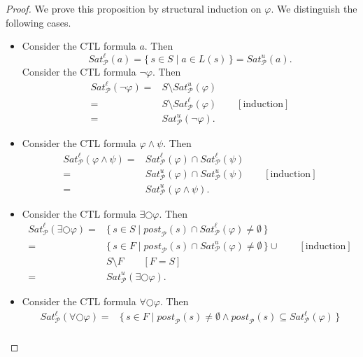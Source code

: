 \documentclass[12pt]{article}
\newcommand{\nxt}{\bigcirc}
\theoremstyle{definition}
\newcommand{\comment}[1]{\hspace{2em}[\mbox{#1}]}
\begin{document}
\begin{proof}
We prove this proposition by structural induction on $\varphi$.  We distinguish the following cases.
\begin{itemize}
\item 
Consider the CTL formula $a$.  Then
\[
\mathit{Sat}^{\ell}_{\mathcal{P}}(a)
= \{\, s \in S \mid a \in L(s) \,\}
= \mathit{Sat}^u_{\mathcal{P}}(a).
\]
Consider the CTL formula $\neg \varphi$.  Then
\begin{align*}
\mathit{Sat}^{\ell}_{\mathcal{P}}(\neg \varphi)
= & S \setminus \mathit{Sat}^{u}_{\mathcal{P}}(\varphi)\\
= & S \setminus \mathit{Sat}^{\ell}_{\mathcal{P}}(\varphi)
\comment{induction}\\
= & \mathit{Sat}^u_{\mathcal{P}}(\neg \varphi).
\end{align*}
\item
Consider the CTL formula $\varphi \wedge \psi$.  Then
\begin{align*}
\mathit{Sat}^{\ell}_{\mathcal{P}}(\varphi \wedge \psi)
= & \mathit{Sat}^{\ell}_{\mathcal{P}}(\varphi) \cap \mathit{Sat}^{\ell}_{\mathcal{P}}(\psi)\\
= & \mathit{Sat}^u_{\mathcal{P}}(\varphi) \cap \mathit{Sat}^u_{\mathcal{P}}(\psi)
\comment{induction}\\
= & \mathit{Sat}^u_{\mathcal{P}}(\varphi \wedge \psi).
\end{align*}
\item
Consider the CTL formula $\exists \nxt \varphi$.  Then
\begin{align*}
\mathit{Sat}^{\ell}_{\mathcal{P}}(\exists \nxt \varphi)
= & \{\, s \in S \mid \mathit{post}_{\mathcal{P}}(s) \cap \mathit{Sat}^{\ell}_{\mathcal{P}}(\varphi) \not= \emptyset \,\}\\
= & \{\, s \in F \mid \mathit{post}_{\mathcal{P}}(s) \cap \mathit{Sat}^u_{\mathcal{P}}(\varphi) \not= \emptyset \,\} \cup
\comment{induction}\\
& S \setminus F
\comment{$F = S$}\\
= & \mathit{Sat}^u_{\mathcal{P}}(\exists \nxt \varphi).
\end{align*}
\item
Consider the CTL formula $\forall \nxt \varphi$.  Then
\begin{align*}
\mathit{Sat}^{\ell}_{\mathcal{P}}(\forall \nxt \varphi)
= & \{\, s \in F \mid \mathit{post}_{\mathcal{P}}(s) \not= \emptyset \wedge \mathit{post}_{\mathcal{P}}(s) \subseteq \mathit{Sat}^{\ell}_{\mathcal{P}}(\varphi) \,\}\\

\end{align*}
\end{itemize}
\end{proof}
\end{document}
